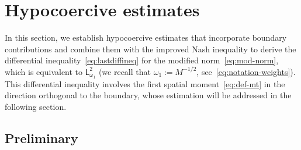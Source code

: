 \documentclass[11pt]{amsart}
\theoremstyle{definition}
\theoremstyle{remark}
\numberwithin{equation}{section}
\newcommand{\sfL}{\mathsf{L}}
\begin{document}
\section{Hypocoercive estimates}
\label{sec:kin-int}

In this section, we establish hypocoercive estimates that incorporate boundary contributions and combine them with the improved Nash inequality to derive the differential inequality~\eqref{eq:lastdiffineq} for the modified norm~\eqref{eq:mod-norm}, which is equivalent to $\sfL^2_{\omega_1}$ (we recall that $\omega_1 := M^{-1/2}$, see~\eqref{eq:notation-weights}). This differential inequality involves the first spatial moment~\eqref{eq:def-mt} in the direction orthogonal to the boundary, whose estimation will be addressed in the following section.

\subsection{Preliminary}
\label{subsection-setting}
\end{document}
